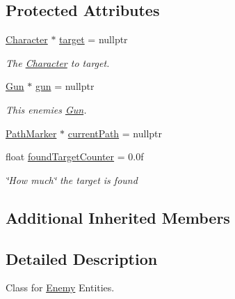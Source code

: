 \subsection*{Protected Attributes}
\begin{DoxyCompactItemize}
\item 
\mbox{\label{class_enemy_a26e09d7fffa9e9bb902efa082050435a}} 
\mbox{\hyperlink{class_character}{Character}} $\ast$ \mbox{\hyperlink{class_enemy_a26e09d7fffa9e9bb902efa082050435a}{target}} = nullptr
\begin{DoxyCompactList}\small\item\em The \mbox{\hyperlink{class_character}{Character}} to target. \end{DoxyCompactList}\item 
\mbox{\label{class_enemy_a8ca8c98e8f99094135ef906e174850df}} 
\mbox{\hyperlink{class_gun}{Gun}} $\ast$ \mbox{\hyperlink{class_enemy_a8ca8c98e8f99094135ef906e174850df}{gun}} = nullptr
\begin{DoxyCompactList}\small\item\em This enemies \mbox{\hyperlink{class_gun}{Gun}}. \end{DoxyCompactList}\item 
\mbox{\hyperlink{class_path_marker}{Path\+Marker}} $\ast$ \mbox{\hyperlink{class_enemy_a2ed2cdccc45d64b19b401029cd9ac063}{current\+Path}} = nullptr
\item 
\mbox{\label{class_enemy_a1e5036dedc9e5ca5bd69208173b8214e}} 
float \mbox{\hyperlink{class_enemy_a1e5036dedc9e5ca5bd69208173b8214e}{found\+Target\+Counter}} = 0.\+0f
\begin{DoxyCompactList}\small\item\em \char`\"{}\+How much\char`\"{} the target is found \end{DoxyCompactList}\end{DoxyCompactItemize}
\subsection*{Additional Inherited Members}


\subsection{Detailed Description}
Class for \mbox{\hyperlink{class_enemy}{Enemy}} Entities. 

